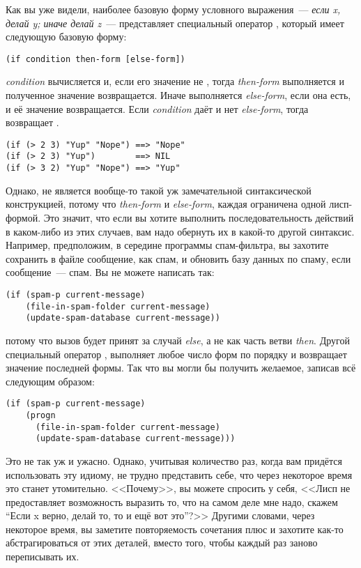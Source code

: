 Как вы уже видели, наиболее базовую форму условного выражения~--- \textit{если x, делай y;
  иначе делай z}~--- представляет специальный оператор , который имеет следующую
базовую форму:

\begin{lstlisting}
(if condition then-form [else-form])
\end{lstlisting}

\textit{condition} вычисляется и, если его значение не , тогда
\textit{then-form} выполняется и полученное значение возвращается. Иначе выполняется
\textit{else-form}, если она есть, и её значение возвращается. Если \textit{condition}
даёт  и нет \textit{else-form}, тогда  возвращает .

\begin{lstlisting}
(if (> 2 3) "Yup" "Nope") ==> "Nope"
(if (> 2 3) "Yup")        ==> NIL
(if (> 3 2) "Yup" "Nope") ==> "Yup"
\end{lstlisting}

Однако,  не является вообще-то такой уж замечательной синтаксической
конструкцией, потому что \textit{then-form} и \textit{else-form}, каждая ограничена одной
лисп-формой. Это значит, что если вы хотите выполнить последовательность действий в
каком-либо из этих случаев, вам надо обернуть их в какой-то другой синтаксис. Например,
предположим, в середине программы спам-фильтра, вы захотите сохранить в файле сообщение,
как спам, и обновить базу данных по спаму, если сообщение~--- спам. Вы не можете написать
так:

\begin{lstlisting}
(if (spam-p current-message)
    (file-in-spam-folder current-message)
    (update-spam-database current-message))
\end{lstlisting}

потому что вызов  будет принят за случай \textit{else}, а не
как часть ветви \textit{then}. Другой специальный оператор , выполняет любое
число форм по порядку и возвращает значение последней формы. Так что вы могли бы получить
желаемое, записав всё следующим образом:

\begin{lstlisting}
(if (spam-p current-message)
    (progn
      (file-in-spam-folder current-message)
      (update-spam-database current-message)))
\end{lstlisting}

Это не так уж и ужасно. Однако, учитывая количество раз, когда вам придётся использовать
эту идиому, не трудно представить себе, что через некоторое время это станет
утомительно. <<Почему>>, вы можете спросить у себя, <<Лисп не предоставляет возможность
выразить то, что на самом деле мне надо, скажем ``Если x верно, делай то, то и ещё вот
это''?>> Другими словами, через некоторое время, вы заметите повторяемость сочетания
 плюс  и захотите как-то абстрагироваться от этих деталей, вместо
того, чтобы каждый раз заново переписывать их.

